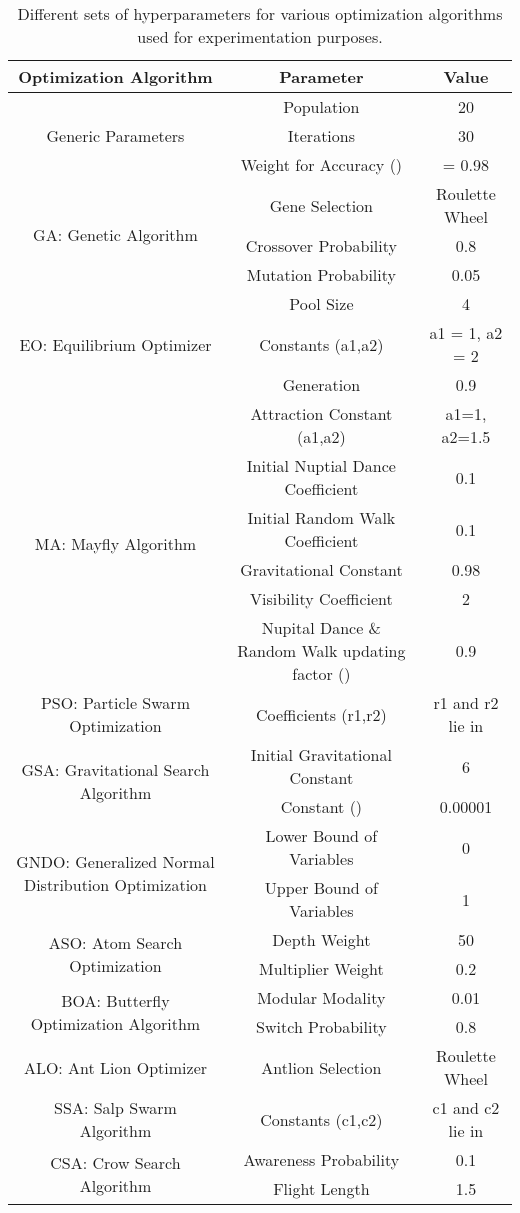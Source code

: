 \documentclass[final,3p,times]{elsarticle}
\begin{document}
\begin{table*}[ht!]
\caption{{Different sets of hyperparameters for various optimization algorithms used for experimentation purposes.}}
\centering
\begin{tabular}{c|cc}
\toprule
Optimization Algorithm & Parameter & Value\\
\midrule
    \multirow{3}{*}{Generic Parameters} & Population & 20\\
    & Iterations & 30\\
    & Weight for Accuracy () &  = 0.98\\
    \midrule
    \multirow{3}{*}{GA: Genetic Algorithm} &  Gene Selection & Roulette Wheel\\
    & Crossover Probability & 0.8\\
    & Mutation Probability & 0.05\\
    \midrule
    \multirow{3}{*}{EO: Equilibrium Optimizer} & Pool Size & 4\\
    & Constants (a1,a2)& a1 = 1, a2 = 2\\
    & Generation & 0.9\\
    \midrule
    \multirow{6}{*}{MA: Mayfly Algorithm} & Attraction Constant (a1,a2) & a1=1, a2=1.5\\
    & Initial Nuptial Dance Coefficient & 0.1\\
    & Initial Random Walk Coefficient & 0.1\\
    & Gravitational Constant & 0.98\\
    & Visibility Coefficient & 2\\
    & Nupital Dance \& Random Walk updating factor () & 0.9\\
    \midrule
    PSO: Particle Swarm Optimization & Coefficients (r1,r2) & r1 and r2 lie in \\
    \midrule
    \multirow{2}{*}{GSA: Gravitational Search Algorithm} & Initial Gravitational Constant & 6\\
    & Constant () & 0.00001\\
    \midrule
    \multirow{2}{*}{{\footnotesize GNDO: Generalized Normal Distribution Optimization}} & Lower Bound of Variables & 0\\
    & Upper Bound of Variables & 1\\
    \midrule
    \multirow{2}{*}{ASO: Atom Search Optimization} & Depth Weight & 50\\
    & Multiplier Weight & 0.2\\
    \midrule
    \multirow{2}{*}{BOA: Butterfly Optimization Algorithm} & Modular Modality & 0.01\\
    & Switch Probability & 0.8\\
    \midrule
    ALO: Ant Lion Optimizer & Antlion Selection & Roulette Wheel\\
    \midrule
    SSA: Salp Swarm Algorithm & Constants (c1,c2) & c1 and c2 lie in \\
    \midrule
    \multirow{2}{*}{CSA: Crow Search Algorithm} & Awareness Probability & 0.1\\
    & Flight Length & 1.5\\
    \bottomrule
\end{tabular}
\label{tab:fspara}
\end{table*}
\end{document}
